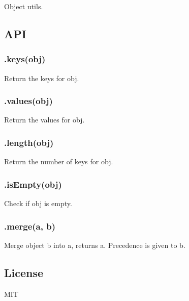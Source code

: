 Object utils.

\subsection*{A\+PI}

\subsubsection*{.keys(obj)}

Return the keys for {\ttfamily obj}.

\subsubsection*{.values(obj)}

Return the values for {\ttfamily obj}.

\subsubsection*{.length(obj)}

Return the number of keys for {\ttfamily obj}.

\subsubsection*{.is\+Empty(obj)}

Check if {\ttfamily obj} is empty.

\subsubsection*{.merge(a, b)}

Merge object {\ttfamily b} into {\ttfamily a}, returns {\ttfamily a}. Precedence is given to {\ttfamily b}.

\subsection*{License}

M\+IT 